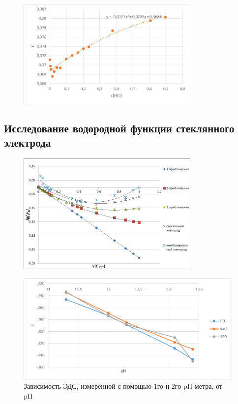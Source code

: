 \documentclass[a4paper, 12pt]{article}
\begin{document}
\begin{figure}[h!]
	\centering
	\caption{}
\includegraphics[width=0.8\textwidth]{image007.png}
\end{figure}
\subsection{Исследование водородной функции стеклянного электрода}


\begin{figure}[h!]
	\centering
	\caption{}
\includegraphics[width=0.8\textwidth]{image013.png}
\end{figure}
\newpage

\begin{figure}[t]
	\centering
	\caption{Зависимость ЭДС, измеренной с помощью 1го и 2го pH-метра, от pH}
\includegraphics[width=1\textwidth]{image015.png}
\end{figure}
\end{document}
